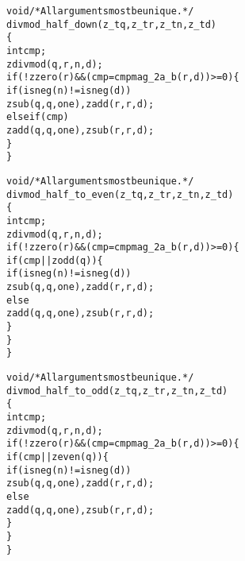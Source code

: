 \begin{alltt}
   void \textcolor{c}{/* \textrm{All arguments most be unique.} */}
   divmod_half_down(z_t q, z_t r, z_t n, z_t d)
   \{
       int cmp;
       zdivmod(q, r, n, d);
       if (!zzero(r) && (cmp = cmpmag_2a_b(r, d)) >= 0) \{
           if (isneg(n) != isneg(d))
               zsub(q, q, one), zadd(r, r, d);
           else if (cmp)
               zadd(q, q, one), zsub(r, r, d);
       \}
   \}
\end{alltt}

\begin{alltt}
   void \textcolor{c}{/* \textrm{All arguments most be unique.} */}
   divmod_half_to_even(z_t q, z_t r, z_t n, z_t d)
   \{
       int cmp;
       zdivmod(q, r, n, d);
       if (!zzero(r) && (cmp = cmpmag_2a_b(r, d)) >= 0) \{
           if (cmp || zodd(q)) \{
               if (isneg(n) != isneg(d))
                   zsub(q, q, one), zadd(r, r, d);
               else
                   zadd(q, q, one), zsub(r, r, d);
           \}
       \}
   \}
\end{alltt}

\newpage
\begin{alltt}
   void \textcolor{c}{/* \textrm{All arguments most be unique.} */}
   divmod_half_to_odd(z_t q, z_t r, z_t n, z_t d)
   \{
       int cmp;
       zdivmod(q, r, n, d);
       if (!zzero(r) && (cmp = cmpmag_2a_b(r, d)) >= 0) \{
           if (cmp || zeven(q)) \{
               if (isneg(n) != isneg(d))
                   zsub(q, q, one), zadd(r, r, d);
               else
                   zadd(q, q, one), zsub(r, r, d);
           \}
       \}
   \}
\end{alltt}


